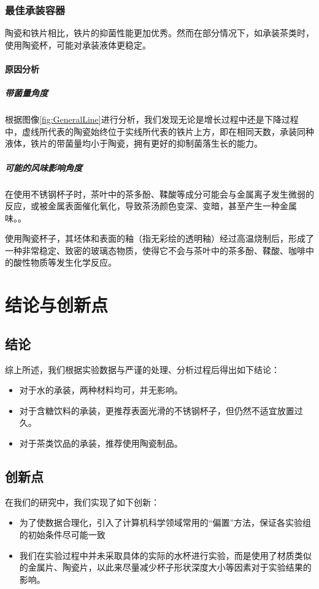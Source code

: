 \documentclass[12pt,a4paper]{ctexart}
\begin{document}
\subsubsection{最佳承装容器}
陶瓷和铁片相比，铁片的抑菌性能更加优秀。然而在部分情况下，如承装茶类时，使用陶瓷杯，可能对承装液体更稳定。

\paragraph{原因分析}
\subparagraph{带菌量角度}
根据图像\ref{fig:GeneralLine}进行分析，我们发现无论是增长过程中还是下降过程中，虚线所代表的陶瓷始终位于实线所代表的铁片上方，即在相同天数，承装同种液体，铁片的带菌量均小于陶瓷，拥有更好的抑制菌落生长的能力。
\subparagraph{可能的风味影响角度}
在使用不锈钢杯子时，茶叶中的茶多酚、鞣酸等成分可能会与金属离子发生微弱的反应，或被金属表面催化氧化，导致茶汤颜色变深、变暗，甚至产生一种金属味。\cite{JSHJ201504002}。

使用陶瓷杯子，其坯体和表面的釉（指无彩绘的透明釉）经过高温烧制后，形成了一种非常稳定、致密的玻璃态物质，使得它不会与茶叶中的茶多酚、鞣酸、咖啡中的酸性物质等发生化学反应。 

\section{结论与创新点}
\subsection{结论}
综上所述，我们根据实验数据与严谨的处理、分析过程后得出如下结论：
\begin{itemize}
    \item 对于水的承装，两种材料均可，并无影响。
    \item 对于含糖饮料的承装，更推荐表面光滑的不锈钢杯子，但仍然不适宜放置过久。
    \item 对于茶类饮品的承装，推荐使用陶瓷制品。
\end{itemize}

\subsection{创新点}
在我们的研究中，我们实现了如下创新：
\begin{itemize}
    \item 为了使数据合理化，引入了计算机科学领域常用的“偏置”方法，保证各实验组的初始条件尽可能一致
    \item 我们在实验过程中并未采取具体的实际的水杯进行实验，而是使用了材质类似的金属片、陶瓷片，以此来尽量减少杯子形状深度大小等因素对于实验结果的影响。
\end{itemize}
\end{document}
